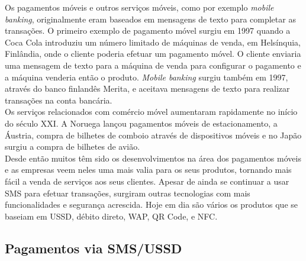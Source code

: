 Os pagamentos móveis e outros serviços móveis, como por exemplo \textit{mobile banking}, originalmente eram baseados em mensagens de texto para completar as transações. O primeiro exemplo de pagamento móvel surgiu em 1997 quando a Coca Cola introduziu um número limitado de máquinas de venda, em Helsínquia, Finlândia, onde o cliente poderia efetuar um pagamento móvel. O cliente enviaria uma mensagem de texto para a máquina de venda para configurar o pagamento e a máquina venderia então o produto. \textit{Mobile banking} surgiu também em 1997, através do banco finlandês Merita, e aceitava mensagens de texto para realizar transações na conta bancária.\cite{nfcorg}
\\Os serviços relacionados com comércio móvel aumentaram rapidamente no início do século XXI. A Noruega lançou pagamentos móveis de estacionamento, a Áustria, compra de bilhetes de comboio através de dispositivos móveis e no Japão surgiu a compra de bilhetes de avião.
\\Desde então muitos têm sido os desenvolvimentos na área dos pagamentos móveis e as empresas veem neles uma mais valia para os seus produtos, tornando mais fácil a venda de serviços aos seus clientes. Apesar de ainda se continuar a usar SMS para efetuar transações, surgiram outras tecnologias com mais funcionalidades e segurança acrescida. Hoje em dia são vários os produtos que se baseiam em USSD, débito direto, WAP, QR Code, e NFC.

\subsection{Pagamentos via SMS/USSD} \label{smsussd} 

